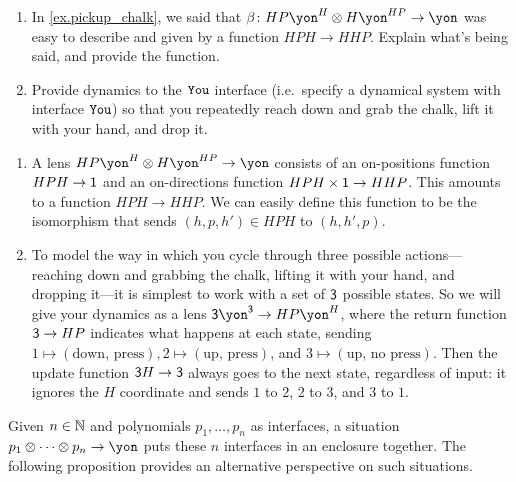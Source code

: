 \documentclass[Book-Poly]{subfiles}
\begin{document}
\begin{exercise}\label{exc.pickup_chalk}
\begin{enumerate}
	\item In \cref{ex.pickup_chalk}, we said that $\beta\colon HP\yon^H\otimes H\yon^{HP}\to\yon$ was easy to describe and given by a function $HPH\to HHP$. Explain what's being said, and provide the function.
	\item Provide dynamics to the $\texttt{You}$ interface (i.e.\ specify a dynamical system with interface $\texttt{You}$) so that you repeatedly reach down and grab the chalk, lift it with your hand, and drop it.
\qedhere
\end{enumerate}
\begin{solution}
\begin{enumerate}
    \item A lens $HP\yon^H \otimes H\yon^{HP} \to \yon$ consists of an on-positions function $HPH \to \textsf{1}$ and an on-directions function $HPH \times \textsf{1} \to HHP$.
    This amounts to a function $HPH \to HHP$.
    We can easily define this function to be the isomorphism that sends $(h,p,h') \in HPH$ to $(h,h',p)$.
    \item To model the way in which you cycle through three possible actions---reaching down and grabbing the chalk, lifting it with your hand, and dropping it---it is simplest to work with a set of $\textsf{3}$ possible states.
    So we will give your dynamics as a lens $\3\yon^\3 \to HP\yon^H$, where the return function $\textsf{3} \to HP$ indicates what happens at each state, sending $1 \mapsto (\text{down, press}), 2 \mapsto (\text{up, press})$, and $3 \mapsto (\text{up, no press})$.
    Then the update function $\textsf{3}H \to \textsf{3}$ always goes to the next state, regardless of input: it ignores the $H$ coordinate and sends $1$ to $2$, $2$ to $3$, and $3$ to $1$.
\end{enumerate}
\end{solution}
\end{exercise}

Given $n\in\mathbb{N}$ and polynomials $p_1,\ldots,p_n$ as interfaces, a situation $p_1\otimes\cdots\otimes p_n\to\yon$ puts these $n$ interfaces in an enclosure together.
The following proposition provides an alternative perspective on such situations.
\end{document}
